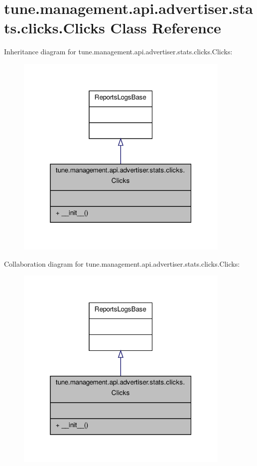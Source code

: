 \hypertarget{classtune_1_1management_1_1api_1_1advertiser_1_1stats_1_1clicks_1_1Clicks}{\section{tune.\-management.\-api.\-advertiser.\-stats.\-clicks.\-Clicks Class Reference}
\label{classtune_1_1management_1_1api_1_1advertiser_1_1stats_1_1clicks_1_1Clicks}
}


Inheritance diagram for tune.\-management.\-api.\-advertiser.\-stats.\-clicks.\-Clicks\-:
\nopagebreak
\begin{figure}[H]
\begin{center}
\leavevmode
\includegraphics[width=292pt]{classtune_1_1management_1_1api_1_1advertiser_1_1stats_1_1clicks_1_1Clicks__inherit__graph}
\end{center}
\end{figure}


Collaboration diagram for tune.\-management.\-api.\-advertiser.\-stats.\-clicks.\-Clicks\-:
\nopagebreak
\begin{figure}[H]
\begin{center}
\leavevmode
\includegraphics[width=292pt]{classtune_1_1management_1_1api_1_1advertiser_1_1stats_1_1clicks_1_1Clicks__coll__graph}
\end{center}
\end{figure}
